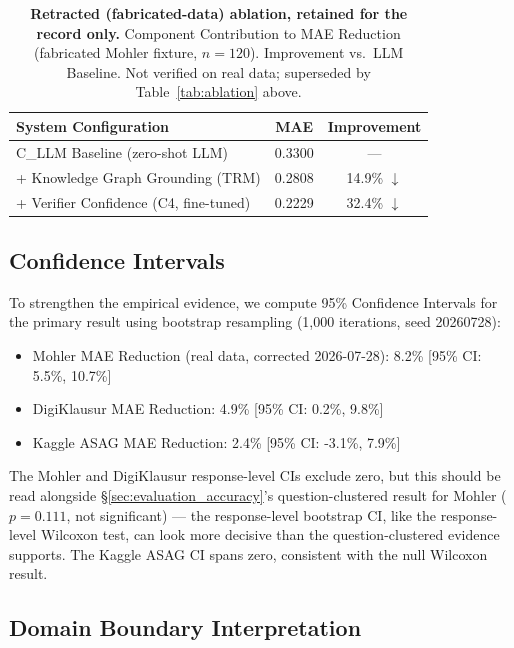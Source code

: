 \documentclass[journal,review]{vgtc}
\begin{document}
\begin{table}[ht]
\centering
\caption{\textbf{Retracted (fabricated-data) ablation, retained for the record only.} Component Contribution to MAE Reduction (fabricated Mohler fixture, $n=120$). Improvement vs.\ LLM Baseline. Not verified on real data; superseded by Table~\ref{tab:ablation} above.}
\label{tab:ablation-old}
\small
\begin{tabular}{lcc}
\toprule
\textbf{System Configuration} & \textbf{MAE} & \textbf{Improvement} \\
\midrule
C\_LLM Baseline (zero-shot LLM) & 0.3300 & --- \\
+ Knowledge Graph Grounding (TRM) & 0.2808 & 14.9\% $\downarrow$ \\
+ Verifier Confidence (C4, fine-tuned) & 0.2229 & 32.4\% $\downarrow$ \\
\bottomrule
\end{tabular}
\end{table}

\subsection{Confidence Intervals}

To strengthen the empirical evidence, we compute 95\% Confidence Intervals for the primary result using bootstrap resampling (1,000 iterations, seed 20260728):

\begin{itemize}
  \item Mohler MAE Reduction (real data, corrected 2026-07-28): 8.2\% [95\% CI: 5.5\%, 10.7\%]
  \item DigiKlausur MAE Reduction: 4.9\% [95\% CI: 0.2\%, 9.8\%]
  \item Kaggle ASAG MAE Reduction: 2.4\% [95\% CI: -3.1\%, 7.9\%]
\end{itemize}

The Mohler and DigiKlausur response-level CIs exclude zero, but this
should be read alongside \S\ref{sec:evaluation_accuracy}'s
question-clustered result for Mohler ($p=0.111$, not significant) ---
the response-level bootstrap CI, like the response-level Wilcoxon test,
can look more decisive than the question-clustered evidence supports.
The Kaggle ASAG CI spans zero, consistent with the null Wilcoxon result.

\subsection{Domain Boundary Interpretation}
\end{document}

